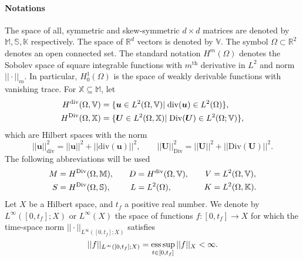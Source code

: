 \paragraph{Notations}
The space of all, symmetric and skew-symmetric $d\times d$ matrices are denoted by $\mathbb{M}, \mathbb{S}, \mathbb{K}$ respectively. The space of $\mathbb{R}^d$ vectors is denoted by $\mathbb{V}$. The symbol $\Omega \subset \mathbb{R}^2$ denotes an open connected set. The standard notation $H^m(\Omega)$ denotes the Sobolev space of square integrable functions with  $m^\text{th}$ derivative in $L^2$ and norm $||\cdot||_m$. In particular, $H^1_0(\Omega)$ is the space of weakly derivable functions with vanishing trace. For $\mathbb{X} \subseteq \mathbb{M}$, let
\begin{equation*}
\begin{aligned}
H^{\operatorname{div}}(\Omega, \mathbb{V}) &= \{\bm{u} \in L^2(\Omega, \mathbb{V}) \vert \; \mathrm{div}(\bm{u}) \in L^2(\Omega) \}, \\
H^{\operatorname*{Div}}(\Omega, \mathbb{X}) &= \{\bm{U} \in L^2(\Omega, \mathbb{X}) \vert \; \mathrm{Div}(\bm{U}) \in L^2(\Omega; \mathbb{V}) \},
\end{aligned}
\end{equation*}
which are Hilbert spaces with the norm 
\begin{equation*}
||\bm{u}||^2_{\text{div}} = ||\bm{u}||^2 + ||\mathrm{div}(\bm{u})||^2, \qquad
||\bm{U}||^2_{\text{Div}} = ||\bm{U}||^2 + ||\mathrm{Div}(\bm{U})||^2.
\end{equation*}
The following abbreviations will be used
\begin{equation*}
\begin{aligned}
M &= H^{\operatorname*{Div}}(\Omega, \mathbb{M}), \\
S &= H^{\operatorname*{Div}}(\Omega, \mathbb{S}),
\end{aligned} \qquad
\begin{aligned}
D &= H^{\operatorname{div}}(\Omega, \mathbb{V}), \\
L &= L^2(\Omega),
\end{aligned} \qquad
\begin{aligned}
V &= L^2(\Omega, \mathbb{V}), \\
K &= L^2(\Omega, \mathbb{K}).
\end{aligned}
\end{equation*}
Let ${X}$ be a Hilbert space, and $t_f$ a positive real number. We denote by $L^\infty([0, t_f]; {X})$ or $L^\infty({X})$ the space of functions $f: [0, t_f] \rightarrow X$ for which the time-space norm $||\cdot||_{L^\infty([0, t_f]; {X})}$ satisfies
\[
||f||_{L^\infty([0, t_f]; {X})} = \operatorname*{ess\,sup}_{t \in [0,t_f]} ||f||_{{X}} < \infty.
\]

